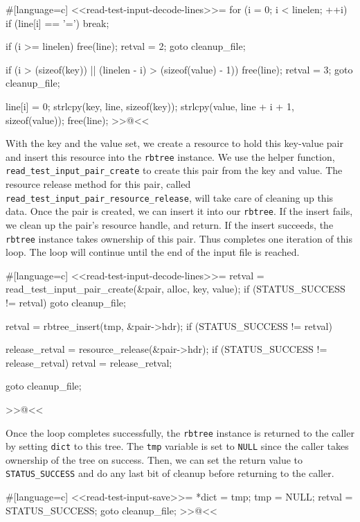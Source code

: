{{#[language=c]
<<read-test-input-decode-lines>>=
        for (i = 0; i < linelen; ++i)
            if (line[i] == '=')
                break;

        if (i >= linelen)
        {
            free(line);
            retval = 2;
            goto cleanup_file;
        }

        if (i > (sizeof(key)) || (linelen - i) > (sizeof(value) - 1))
        {
            free(line);
            retval = 3;
            goto cleanup_file;
        }

        line[i] = 0;
        strlcpy(key, line, sizeof(key));
        strlcpy(value, line + i + 1, sizeof(value));
        free(line);
>>@<<

With the key and the value set, we create a resource to hold this key-value pair
and insert this resource into the \verb/rbtree/ instance. We use the helper
function, \verb/read_test_input_pair_create/ to create this pair from the key
and value.  The resource release method for this pair, called
\verb/read_test_input_pair_resource_release/, will take care of cleaning up this
data. Once the pair is created, we can insert it into our \verb/rbtree/. If the
insert fails, we clean up the pair's resource handle, and return. If the insert
succeeds, the \verb/rbtree/ instance takes ownership of this pair. Thus
completes one iteration of this loop. The loop will continue until the end of
the input file is reached.

#[language=c]
<<read-test-input-decode-lines>>=
        retval = read_test_input_pair_create(&pair, alloc, key, value);
        if (STATUS_SUCCESS != retval)
        {
            goto cleanup_file;
        }

        retval = rbtree_insert(tmp, &pair->hdr);
        if (STATUS_SUCCESS != retval)
        {
            release_retval = resource_release(&pair->hdr);
            if (STATUS_SUCCESS != release_retval)
            {
                retval = release_retval;
            }

            goto cleanup_file;
        }
    }
>>@<<

Once the loop completes successfully, the \verb/rbtree/ instance is returned to
the caller by setting \verb/dict/ to this tree. The \verb/tmp/ variable is set
to \verb/NULL/ since the caller takes ownership of the tree on success. Then, we
can set the return value to \verb/STATUS_SUCCESS/ and do any last bit of cleanup
before returning to the caller.

#[language=c]
<<read-test-input-save>>=
    *dict = tmp;
    tmp = NULL;
    retval = STATUS_SUCCESS;
    goto cleanup_file;
>>@<<

}

